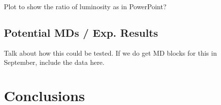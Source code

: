 Plot to show the ratio of luminosity as in PowerPoint?

\subsection{Potential MDs / Exp. Results}

Talk about how this could be tested.
If we do get MD blocks for this in September, include the data here.


\section{Conclusions}

